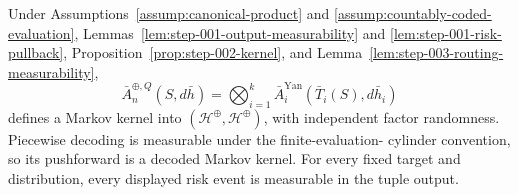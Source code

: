 \begin{proposition}
\label{prop:step-003-product-kernel}
Under Assumptions~\ref{assump:canonical-product} and
\ref{assump:countably-coded-evaluation}, Lemmas~\ref{lem:step-001-output-measurability}
and \ref{lem:step-001-risk-pullback},
Proposition~\ref{prop:step-002-kernel}, and
Lemma~\ref{lem:step-003-routing-measurability},
\begin{equation}\label{eq:step-003-product-kernel}
\bar A_n^{\oplus,Q}(S,d\bar h)
=\bigotimes_{i=1}^k
\bar A_i^{\mathrm{Yan}}(\bar T_i(S),d\bar h_i)
\end{equation}
defines a Markov kernel into
\((\mathcal H^{\oplus},\mathscr H^{\oplus})\), with independent factor
randomness.  Piecewise decoding is measurable under the finite-evaluation-
cylinder convention, so its pushforward is a decoded Markov kernel.  For
every fixed target and distribution, every displayed risk event is
measurable in the tuple output.
\end{proposition}

